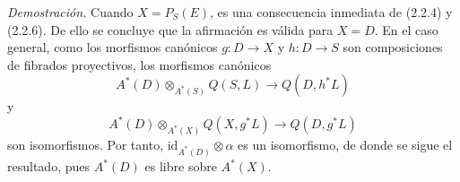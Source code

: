 \emph{Demostración.} Cuando $X=P_S(E)$, es una consecuencia inmediata de (2.2.4) y (2.2.6). De ello se concluye que la afirmación es válida para $X=D$. En el caso general, como los morfismos canónicos $g:D\to X$ y $h:D\to S$ son composiciones de fibrados proyectivos, los morfismos canónicos
\[
A^*(D)\otimes_{A^*(S)}Q(S,L)\to Q(D,h^*L)
\]
y
\[
A^*(D)\otimes_{A^*(X)}Q(X,g^*L)\to Q(D,g^*L)
\]
son isomorfismos. Por tanto, $\mathrm{id}_{A^*(D)}\otimes\alpha$ es un isomorfismo, de donde se sigue el resultado, pues $A^*(D)$ es libre sobre $A^*(X)$.
